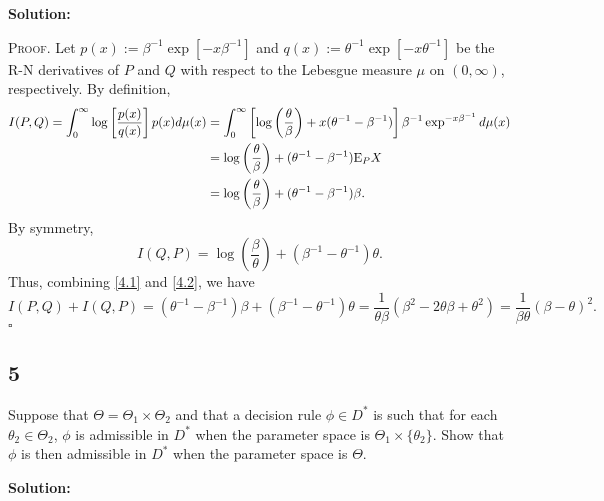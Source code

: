 \documentclass[12pt]{article}
\newcounter{ProofCounter}
\newenvironment{Proof}{\stepcounter{ProofCounter}\textsc{Proof.}}{\hfill$\square$}
\begin{document}
\textbf{Solution:}

\begin{Proof}
  Let $p(x) := \beta^{-1}\exp\left[ -x\beta^{-1} \right]$ and $q(x) := \theta^{-1}\exp\left[ -x\theta^{-1} \right]$ be the R-N derivatives of $P$ and
  $Q$ with respect to the Lebesgue measure $\mu$ on $(0,\infty)$, respectively. By definition,
  \begin{align}
    I(P,Q) = \int_{0}^{\infty}\log\left[ \frac{p(x)}{q(x)} \right]p(x)d\mu(x) & = \int_{0}^{\infty}\left[ \log\left( \frac{\theta}{\beta}\right) + 
    x(\theta^{-1} - \beta^{-1}) \right]\beta^{-1}\exp^{-x\beta^{-1}}d\mu(x) \nonumber \\
    & = \log\left( \frac{\theta}{\beta} \right) + (\theta^{-1} - \beta^{-1})\mathrm{E}_{P}X \nonumber \\
    & = \log\left( \frac{\theta}{\beta} \right) + (\theta^{-1} - \beta^{-1})\beta. \label{4.1}
  \end{align}
  By symmetry,
  \begin{equation}
    I(Q,P) = \log\left( \frac{\beta}{\theta} \right) + (\beta^{-1} - \theta^{-1})\theta.
    \label{4.2}
  \end{equation}
  Thus, combining \eqref{4.1} and \eqref{4.2}, we have 
  \[ 
    I(P,Q) + I(Q,P) = (\theta^{-1} - \beta^{-1})\beta + (\beta^{-1} - \theta^{-1})\theta = \frac{1}{\theta\beta}(\beta^{2} - 2\theta\beta +
    \theta^{2}) = \frac{1}{\beta\theta}(\beta - \theta)^{2}.
  \]
\end{Proof}


\newpage
\subsection*{5}
\begin{tcolorbox}
  Suppose that $\Theta = \Theta_1 \times \Theta_2$ and that a decision rule $\phi \in D^*$ is such that for each $\theta_2\in\Theta_2$, $\phi$
  is admissible in $D^*$ when the parameter space is $\Theta_1\times \{\theta_2\}$.  Show that $\phi$ is then admissible in $D^*$ when the parameter space is $\Theta$.
\end{tcolorbox}
\textbf{Solution:} 
\end{document}
